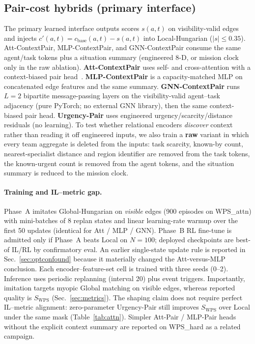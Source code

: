 \documentclass[journal,twocolumn,10pt]{IEEEtran}
\begin{document}
\subsection{Pair-cost hybrids (primary interface)}
The primary learned interface outputs scores \(s(a,t)\) on visibility-valid edges and injects
\(c'(a,t)=c_{\mathrm{base}}(a,t)-s(a,t)\) into Local-Hungarian (\(|s|\le 0.35\)).
Att-ContextPair, MLP-ContextPair, and GNN-ContextPair consume the same agent/task tokens plus a situation summary (engineered 8-D, or mission clock only in the raw ablation).
\textbf{Att-ContextPair} uses self- and cross-attention with a context-biased pair head~\cite{vaswani2017attention}.
\textbf{MLP-ContextPair} is a capacity-matched MLP on concatenated edge features and the same summary.
\textbf{GNN-ContextPair} runs \(L{=}2\) bipartite message-passing layers on the visibility-valid agent--task adjacency (pure PyTorch; no external GNN library), then the same context-biased pair head.
\textbf{Urgency-Pair} uses engineered urgency/scarcity/distance residuals (no learning).
To test whether relational encoders \emph{discover} context rather than reading it off engineered inputs, we also train a \textbf{raw} variant in which every team aggregate is deleted from the inputs: task scarcity, known-by count, nearest-specialist distance and region identifier are removed from the task tokens, the known-urgent count is removed from the agent tokens, and the situation summary is reduced to the mission clock.

\paragraph{Training and IL--metric gap.}
Phase~A imitates Global-Hungarian on \emph{visible} edges (900 episodes on WPS\_attn) with mini-batches of 8 replan states and linear learning-rate warmup over the first 50 updates (identical for Att / MLP / GNN).
Phase~B RL fine-tune is admitted only if Phase~A beats Local on \(N{=}100\); deployed checkpoints are best-of IL/RL by confirmatory eval.
An earlier single-state update rule is reported in Sec.~\ref{sec:optconfound} because it materially changed the Att-versus-MLP conclusion.
Each encoder--feature-set cell is trained with three seeds (0--2).
Inference uses periodic replanning (interval 20) plus event triggers.
Importantly, imitation targets myopic Global matching on visible edges, whereas reported quality is \(S_{\mathrm{WPS}}\) (Sec.~\ref{sec:metrics}).
The shaping claim does not require perfect IL--metric alignment: zero-parameter Urgency-Pair still improves \(S_{\mathrm{WPS}}\) over Local under the same mask (Table~\ref{tab:attn}).
Simpler Att-Pair / MLP-Pair heads without the explicit context summary are reported on WPS\_hard as a related campaign.
\end{document}
